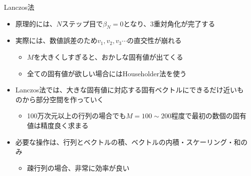 \begin{frame}[t,fragile]{Lanczos法}
  \begin{itemize}
  \item 原理的には、$N$ステップ目で$\beta_N=0$となり、3重対角化が完了する
  \item 実際には、数値誤差のため$v_1,v_2,v_3\cdots$の直交性が崩れる
    \begin{itemize}
      \item $M$を大きくしすぎると、おかしな固有値が出てくる
      \item 全ての固有値が欲しい場合にはHouseholder法を使う
    \end{itemize}
  \item Lanczos法では、大きな固有値に対応する固有ベクトルにできるだけ近いものから部分空間を作っていく
    \begin{itemize}
      \item 100万次元以上の行列の場合でも$M=100 \sim 200$程度で最初の数個の固有値は精度良く求まる
    \end{itemize}
  \item 必要な操作は、行列とベクトルの積、ベクトルの内積・スケーリング・和のみ
    \begin{itemize}
      \item 疎行列の場合、非常に効率が良い
    \end{itemize}
  \end{itemize}
\end{frame}

